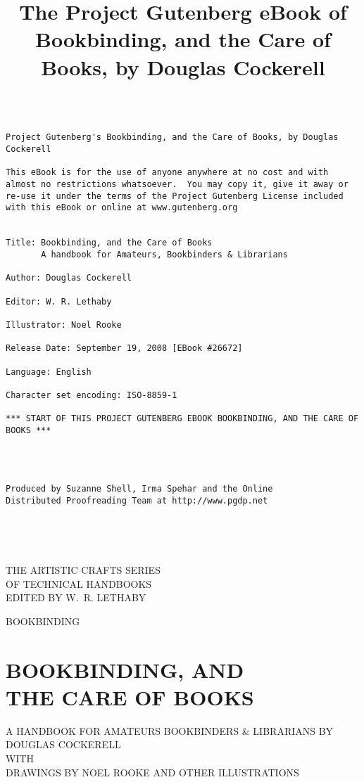 \documentclass[
]{article}
\title{The Project Gutenberg eBook of Bookbinding, and the Care of
Books, by Douglas Cockerell}
\author{}
\date{}
\begin{document}
\maketitle

\begin{verbatim}

Project Gutenberg's Bookbinding, and the Care of Books, by Douglas Cockerell

This eBook is for the use of anyone anywhere at no cost and with
almost no restrictions whatsoever.  You may copy it, give it away or
re-use it under the terms of the Project Gutenberg License included
with this eBook or online at www.gutenberg.org


Title: Bookbinding, and the Care of Books
       A handbook for Amateurs, Bookbinders & Librarians

Author: Douglas Cockerell

Editor: W. R. Lethaby

Illustrator: Noel Rooke

Release Date: September 19, 2008 [EBook #26672]

Language: English

Character set encoding: ISO-8859-1

*** START OF THIS PROJECT GUTENBERG EBOOK BOOKBINDING, AND THE CARE OF BOOKS ***




Produced by Suzanne Shell, Irma Spehar and the Online
Distributed Proofreading Team at http://www.pgdp.net





\end{verbatim}

THE ARTISTIC CRAFTS SERIES\\
OF TECHNICAL HANDBOOKS\\
EDITED BY W.~R. LETHABY

BOOKBINDING

\hypertarget{bookbinding-and-the-care-of-books}{%
\section{\texorpdfstring{BOOKBINDING, AND\\
THE CARE OF
BOOKS}{BOOKBINDING, AND THE CARE OF BOOKS}}\label{bookbinding-and-the-care-of-books}}

A HANDBOOK FOR AMATEURS BOOKBINDERS \& LIBRARIANS BY DOUGLAS COCKERELL\\
WITH\\
DRAWINGS BY NOEL ROOKE AND OTHER ILLUSTRATIONS
\end{document}
